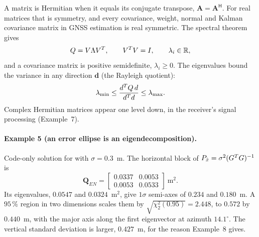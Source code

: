 \documentclass[main.tex]{subfiles}
\begin{document}
A matrix is Hermitian when it equals its conjugate transpose,
$\bm{A} = \bm{A}^{\mathsf{H}}$.  For real matrices that is symmetry, and
every covariance, weight, normal and Kalman covariance matrix in GNSS
estimation is real symmetric.  The spectral theorem gives
\begin{equation}
Q = V\Lambda V^{T},
\qquad
V^{T}V = I,
\qquad
\lambda_i \in \mathbb{R},
\label{eq:la-spectral}
\end{equation}
and a covariance matrix is positive semidefinite, $\lambda_i \ge 0$.  The
eigenvalues bound the variance in any direction $\bm{d}$ (the Rayleigh
quotient):
\begin{equation}
\lambda_{\min} \le
  \frac{d^{T}Q\,d}{d^{T}d}
  \le \lambda_{\max}.
\label{eq:la-rayleigh}
\end{equation}
Complex Hermitian matrices appear one level down, in the receiver's signal
processing (Example~7).

\paragraph{Example 5 (an error ellipse is an eigendecomposition).}
\label{la:ex5}%
Code-only solution for  with $\sigma = 0.3$~m.  The
horizontal block of $P_{\hat x} = \sigma^2(G^{T}G)^{-1}$ is
\begin{equation*}
\bm{Q}_{EN} = \begin{bmatrix} 0.0337 & 0.0053 \\ 0.0053 & 0.0533 \end{bmatrix}\ \mathrm{m}^2 .
\end{equation*}
Its eigenvalues, $0.0547$ and $0.0324$~m$^2$, give $1\sigma$ semi-axes of
$0.234$ and $0.180$~m.  A $95\,\%$ region in two dimensions scales them by
$\sqrt{\chi^2_{2}(0.95)} = 2.448$, to $0.572$ by $0.440$~m, with the major
axis along the first eigenvector at azimuth $14.1^\circ$.  The vertical
standard deviation is larger, $0.427$~m, for the reason Example~8 gives.
\end{document}
